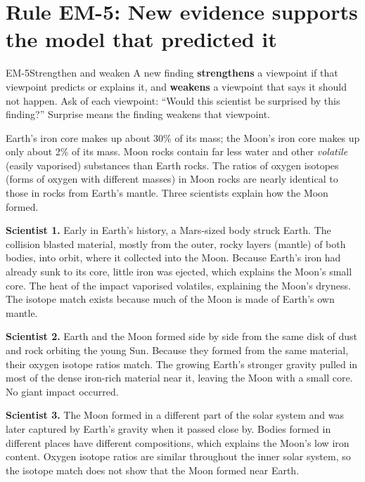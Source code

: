 \documentclass[11pt]{article}
\begin{document}
\section{Rule EM-5: New evidence supports the model that predicted it}

\begin{rulebox}{EM-5}{Strengthen and weaken}
A new finding \textbf{strengthens} a viewpoint if that viewpoint predicts or explains it, and \textbf{weakens} a viewpoint that says it should not happen. Ask of each viewpoint: ``Would this scientist be surprised by this finding?'' Surprise means the finding weakens that viewpoint.
\end{rulebox}


Earth's iron core makes up about 30\% of its mass; the Moon's iron core makes up only about 2\% of its mass. Moon rocks contain far less water and other \emph{volatile} (easily vaporised) substances than Earth rocks. The ratios of oxygen isotopes (forms of oxygen with different masses) in Moon rocks are nearly identical to those in rocks from Earth's mantle. Three scientists explain how the Moon formed.

\textbf{Scientist 1.} Early in Earth's history, a Mars-sized body struck Earth. The collision blasted material, mostly from the outer, rocky layers (mantle) of both bodies, into orbit, where it collected into the Moon. Because Earth's iron had already sunk to its core, little iron was ejected, which explains the Moon's small core. The heat of the impact vaporised volatiles, explaining the Moon's dryness. The isotope match exists because much of the Moon is made of Earth's own mantle.

\textbf{Scientist 2.} Earth and the Moon formed side by side from the same disk of dust and rock orbiting the young Sun. Because they formed from the same material, their oxygen isotope ratios match. The growing Earth's stronger gravity pulled in most of the dense iron-rich material near it, leaving the Moon with a small core. No giant impact occurred.

\textbf{Scientist 3.} The Moon formed in a different part of the solar system and was later captured by Earth's gravity when it passed close by. Bodies formed in different places have different compositions, which explains the Moon's low iron content. Oxygen isotope ratios are similar throughout the inner solar system, so the isotope match does not show that the Moon formed near Earth.
\passageend
\end{document}
